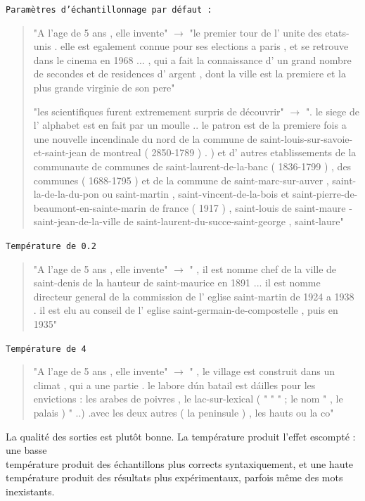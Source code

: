 \noindent{} \texttt{Paramètres d'échantillonnage par défaut :}

\begin{quotation}
"A l'age de 5 ans , elle invente" $\rightarrow$ "le premier tour de l' unite des etats-unis . elle est egalement connue pour ses elections a paris , et se retrouve dans le cinema en 1968 ... , qui a fait la connaissance d' un grand nombre de secondes et de residences d' argent , dont la ville est la premiere et la plus grande virginie de son pere"


"les scientifiques furent extremement surpris de découvrir" $\rightarrow$ ". le siege de l' alphabet est en fait par un moulle .. le patron est de la premiere fois a une nouvelle incendinale du nord de la commune de saint-louis-sur-savoie-et-saint-jean de montreal ( 2850-1789 ) . ) et d' autres etablissements de la communaute de communes de saint-laurent-de-la-banc ( 1836-1799 ) , des communes ( 1688-1795 ) et de la commune de saint-marc-sur-auver , saint-la-de-la-du-pon ou saint-martin , saint-vincent-de-la-bois et saint-pierre-de-beaumont-en-sainte-marin de france ( 1917 ) , saint-louis de saint-maure - saint-jean-de-la-ville de saint-laurent-du-succe-saint-george , saint-laure"
\end{quotation}

\noindent{} \texttt{Température de 0.2}

\begin{quotation}
"A l'age de 5 ans , elle invente" $\rightarrow$ " , il est nomme chef de la ville de saint-denis de la hauteur de saint-maurice en 1891 ... il est nomme directeur general de la commission de l' eglise saint-martin de 1924 a 1938 . il est elu au conseil de l' eglise saint-germain-de-compostelle , puis en 1935"
\end{quotation}

\noindent{} \texttt{Température de 4}

\begin{quotation}
"A l'age de 5 ans , elle invente" $\rightarrow$ " , le village est construit dans un climat , qui a une partie . le labore d\' un batail est d\' ailles pour les envictions : les arabes de poivres , le lac-sur-lexical ( " " " ; le nom " , le palais ) " ..) .avec les deux autres ( la peninsule ) , les hauts ou la co"
\end{quotation}

La qualité des sorties est plutôt bonne. La température produit l'effet
escompté : une basse \\
température produit des échantillons plus corrects
syntaxiquement, et une haute température produit des résultats plus
expérimentaux, parfois même des mots inexistants. \\

